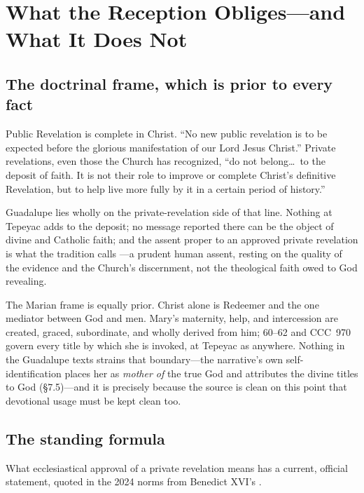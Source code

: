 \sectionguard
\section{What the Reception Obliges---and What It Does Not}

\subsection{The doctrinal frame, which is prior to every fact}

Public Revelation is complete in Christ. ``No new public revelation
is to be expected before the glorious manifestation of our Lord Jesus
Christ.'' Private revelations, even those the Church has recognized,
``do not belong\ldots\ to the deposit of faith. It is not their role
to improve or complete Christ's definitive Revelation, but to help
live more fully by it in a certain period of
history.''

Guadalupe lies wholly on the private-revelation side of that line.
Nothing at Tepeyac adds to the deposit; no message reported there
can be the object of divine and Catholic faith; and the assent
proper to an approved private revelation is what the tradition calls
---a prudent human assent, resting on the quality
of the evidence and the Church's discernment, not the theological
faith owed to God revealing.

The Marian frame is equally prior. Christ alone is Redeemer and the
one mediator between God and men. Mary's maternity, help, and
intercession are created, graced, subordinate, and wholly derived
from him;  60--62 and CCC~970 govern every title
by which she is invoked, at Tepeyac as anywhere. Nothing in the
Guadalupe texts strains that boundary---the narrative's own
self-identification places her as \emph{mother of} the true God and
attributes the divine titles to God (\S7.5)---and it is precisely
because the source is clean on this point that devotional usage must
be kept clean too.

\subsection{The standing formula}

What ecclesiastical approval of a private revelation means has a
current, official statement, quoted in the 2024 norms from Benedict
XVI's .

